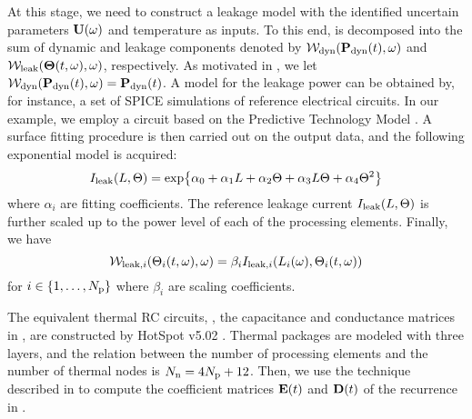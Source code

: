 At this stage, we need to construct a leakage model with the identified uncertain parameters $\mathbf{U}(\omega)$ and temperature as inputs. To this end,  is decomposed into the sum of dynamic and leakage components denoted by $\mathcal{W}_{\text{dyn}}(\mathbf{P}_{\text{dyn}}(t), \omega)$ and $\mathcal{W}_{\text{leak}}({\boldsymbol\Theta}(t, \omega), \omega)$, respectively. As motivated in , we let $\mathcal{W}_{\text{dyn}}(\mathbf{P}_{\text{dyn}}(t), \omega) = \mathbf{P}_{\text{dyn}}(t)$. A model for the leakage power can be obtained by, for instance, a set of SPICE simulations of reference electrical circuits. In our example, we employ a circuit based on the Predictive Technology Model \cite{ptm}. A surface fitting procedure is then carried out on the output data, and the following exponential model is acquired:
\begin{equation} \elabel{leakage-current}
  I_\leak(\Leff, \T) = \text{exp} \big\{ \alpha_0 + \alpha_1 \Leff + \alpha_2 \T + \alpha_3 \Leff \T + \alpha_4 \T^2 \big\}
\end{equation}
where $\alpha_i$ are fitting coefficients. The reference leakage current $I_{\text{leak}}(L, \Theta)$ is further scaled up to the power level of each of the processing elements. Finally, we have
\[
  \mathcal{W}_{\text{leak}, i}(\Theta_i(t, \omega), \omega) = \beta_i I_{\text{leak}, i}(L_i(\omega), \Theta_i(t, \omega))
\]
for $i \in \{ 1, \dotsc, {N_\text{p}} \}$ where $\beta_i$ are scaling coefficients.

The equivalent thermal RC circuits, \ie, the capacitance and conductance matrices in , are constructed by HotSpot v5.02 \cite{hotspot}. Thermal packages are modeled with three layers, and the relation between the number of processing elements and the number of thermal nodes is $N_\text{n} = 4 {N_\text{p}} + 12$. Then, we use the technique described in \cite{ukhov2012} to compute the coefficient matrices $\mE(\t)$ and $\mD(\t)$ of the recurrence in .
